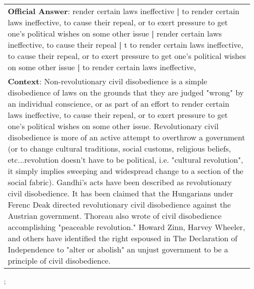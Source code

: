 \begin{figure*}[ht]
{\begin{tabular}{p{}}
            \textbf{Official Answer}: render certain laws ineffective \textbf{|} to render certain laws ineffective, to cause their repeal, or to exert pressure to get one's political wishes on some other issue \textbf{|} render certain laws ineffective, to cause their repeal \textbf{|} t to render certain laws ineffective, to cause their repeal, or to exert pressure to get one's political wishes on some other issue \textbf{|} to render certain laws ineffective,                                                                                                                                                                                                                                                                                                                                                                                                                                                                                                                                                                                                                                                                                 \\
            \textbf{Context}: Non-revolutionary civil disobedience is a simple disobedience of laws on the grounds that they are judged "wrong" by an individual conscience, or as part of an effort to render certain laws ineffective, to cause their repeal, or to exert pressure to get one's political wishes on some other issue. Revolutionary civil disobedience is more of an active attempt to overthrow a government (or to change cultural traditions, social customs, religious beliefs, etc...revolution doesn't have to be political, i.e. "cultural revolution", it simply implies sweeping and widespread change to a section of the social fabric). Gandhi's acts have been described as revolutionary civil disobedience. It has been claimed that the Hungarians under Ferenc Deak directed revolutionary civil disobedience against the Austrian government. Thoreau also wrote of civil disobedience accomplishing "peaceable revolution." Howard Zinn, Harvey Wheeler, and others have identified the right espoused in The Declaration of Independence to "alter or abolish" an unjust government to be a principle of civil disobedience. \\
        \end{tabular}
    };
    \label{fig:ex-5728e07e3acd2414000e00eb}
\end{figure*}

